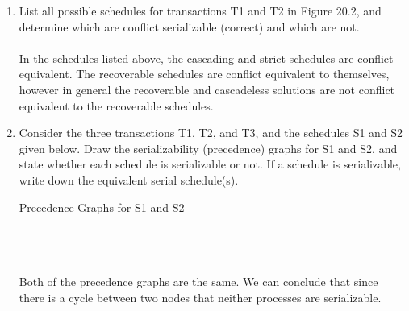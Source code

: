 \documentclass[12pt]{article}
\begin{document}
\begin{enumerate}
	\item  List all possible schedules for transactions T1 and T2 in Figure 20.2, and determine which are conflict serializable (correct) and which are not. \\ \\
	In the schedules listed above, the cascading and strict schedules are conflict equivalent. The recoverable schedules are conflict equivalent to themselves, however in general the recoverable and cascadeless solutions are not conflict equivalent to the recoverable schedules.
	\pagebreak
	\item Consider the three transactions T1, T2, and T3, and the schedules S1 and S2 given below. Draw the serializability (precedence) graphs for S1 and S2, and state whether each schedule is serializable or not. If a schedule is serializable, write down the equivalent serial schedule(s). \\ 
	
	\begin{center}
 		Precedence Graphs for S1 and S2 \\
 \end{center}
    \begin{minipage}{.5\linewidth}
  
      \centering
{}
    \end{minipage}%
    \begin{minipage}{.5\linewidth}
      \centering


    \end{minipage} 
\\ \\ \\
Both of the precedence graphs are the same. We can conclude that since there is a cycle between two nodes that neither processes are serializable. \\
	


\end{enumerate}
\end{document}
